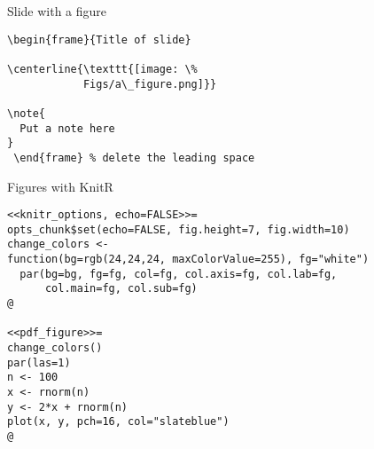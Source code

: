 \documentclass[12pt,t]{beamer}
\begin{document}
\begin{frame}[c,fragile]{Slide with a figure}
\addtocounter{framenumber}{-1}

\begin{lstlisting}
\begin{frame}{Title of slide}

\centerline{\texttt{[image: \%
            Figs/a\_figure.png]}}

\note{
  Put a note here
}
 \end{frame} % delete the leading space
\end{lstlisting}

\end{frame}



\begin{frame}[c,fragile]{Figures with KnitR}

\begin{lstlisting}
<<knitr_options, echo=FALSE>>=
opts_chunk$set(echo=FALSE, fig.height=7, fig.width=10)
change_colors <-
function(bg=rgb(24,24,24, maxColorValue=255), fg="white")
  par(bg=bg, fg=fg, col=fg, col.axis=fg, col.lab=fg,
      col.main=fg, col.sub=fg)
@

<<pdf_figure>>=
change_colors()
par(las=1)
n <- 100
x <- rnorm(n)
y <- 2*x + rnorm(n)
plot(x, y, pch=16, col="slateblue")
@
\end{lstlisting}

\end{frame}
\end{document}
